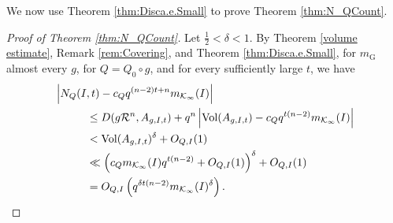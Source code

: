 \documentclass[11pt,a4paper,reqno]{amsart}
\theoremstyle{definition}
\theoremstyle{remark}
\numberwithin{equation}{section}
\begin{document}
We now use Theorem \ref{thm:Disca.e.Small} to prove Theorem \ref{thm:N_QCount}. 
\begin{proof}[Proof of Theorem \ref{thm:N_QCount}]
    Let $\frac{1}{2}<\delta<1$. By Theorem \ref{volume estimate}, Remark \ref{rem:Covering}, and Theorem \ref{thm:Disca.e.Small}, for $m_\mathrm{G}$ almost every $g$, for $Q=Q_0\circ g$, and for every sufficiently large $t$, we have
    \begin{equation}
    \begin{split}
    \label{eqn:N_Q(I_t,t)Cnt}
        &\left|N_Q(I,t)-c_Qq^{(n-2)t+n}m_{\mathcal{K}_{\infty}}(I)\right|\\
        &\hspace{0.4in}\leq D(g\mathcal{R}^n,A_{g,I,t})+q^n\left|\operatorname{Vol}(A_{g,I,t})-c_Qq^{t(n-2)}m_{\mathcal{K}_{\infty}}(I)\right|\\
        &\hspace{0.4in}<\operatorname{Vol}(A_{g,I,t})^{\delta}+O_{Q,I}(1)\\
        &\hspace{0.4in}\ll \left(c_Qm_{\mathcal{K}_{\infty}}(I)q^{t(n-2)}+O_{Q,I}(1)\right)^{\delta}+O_{Q,I}(1)\\
        &\hspace{0.4in}=O_{Q,I}\left(q^{\delta t(n-2)}m_{\mathcal{K}_{\infty}}(I)^{\delta}\right).
    \end{split}
    \end{equation}
\end{proof}
\end{document}
